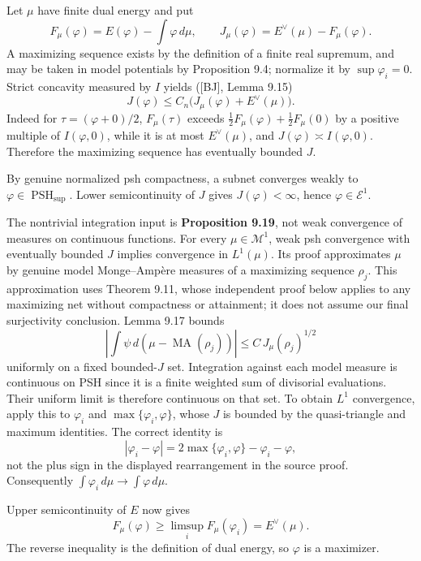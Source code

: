 \documentclass[11pt]{article}
\begin{document}
Let \(\mu\) have finite dual energy and put
\[F_\mu(\varphi)=E(\varphi)-\int\varphi\,d\mu,\qquad
J_\mu(\varphi)=E^\vee(\mu)-F_\mu(\varphi).\] A maximizing sequence
exists by the definition of a finite real supremum, and may be taken in
model potentials by Proposition 9.4; normalize it by
\(\sup\varphi_i=0\). Strict concavity measured by \(I\) yields
({[}BJ{]}, Lemma 9.15)
\[J(\varphi)\leq C_n\big(J_\mu(\varphi)+E^\vee(\mu)\big).\] Indeed for
\(\tau=(\varphi+0)/2\), \(F_\mu(\tau)\) exceeds
\(\tfrac12F_\mu(\varphi)+\tfrac12F_\mu(0)\) by a positive multiple of
\(I(\varphi,0)\), while it is at most \(E^\vee(\mu)\), and
\(J(\varphi)\asymp I(\varphi,0)\). Therefore the maximizing sequence has
eventually bounded \(J\).

By genuine normalized psh compactness, a subnet converges weakly to
\(\varphi\in\operatorname{PSH}_{\sup}\). Lower semicontinuity of \(J\)
gives \(J(\varphi)<\infty\), hence \(\varphi\in\mathcal E^1\).

The nontrivial integration input is \textbf{Proposition 9.19}, not weak
convergence of measures on continuous functions. For every
\(\mu\in\mathcal M^1\), weak psh convergence with eventually bounded
\(J\) implies convergence in \(L^1(\mu)\). Its proof approximates
\(\mu\) by genuine model Monge--Ampère measures of a maximizing sequence
\(\rho_j\). This approximation uses Theorem 9.11, whose independent
proof below applies to any maximizing net without compactness or
attainment; it does not assume our final surjectivity conclusion. Lemma
9.17 bounds
\[\left|\int\psi\,d(\mu-\operatorname{MA}(\rho_j))\right|\leq C\,J_\mu(\rho_j)^{1/2}\]
uniformly on a fixed bounded-\(J\) set. Integration against each model
measure is continuous on PSH since it is a finite weighted sum of
divisorial evaluations. Their uniform limit is therefore continuous on
that set. To obtain \(L^1\) convergence, apply this to \(\varphi_i\) and
\(\max\{\varphi_i,\varphi\}\), whose \(J\) is bounded by the
quasi-triangle and maximum identities. The correct identity is
\[|\varphi_i-\varphi|=2\max\{\varphi_i,\varphi\}-\varphi_i-\varphi,\]
not the plus sign in the displayed rearrangement in the source proof.
Consequently \(\int\varphi_i\,d\mu\to\int\varphi\,d\mu\).

Upper semicontinuity of \(E\) now gives
\[F_\mu(\varphi)\geq\limsup_iF_\mu(\varphi_i)=E^\vee(\mu).\] The reverse
inequality is the definition of dual energy, so \(\varphi\) is a
maximizer.
\end{document}
